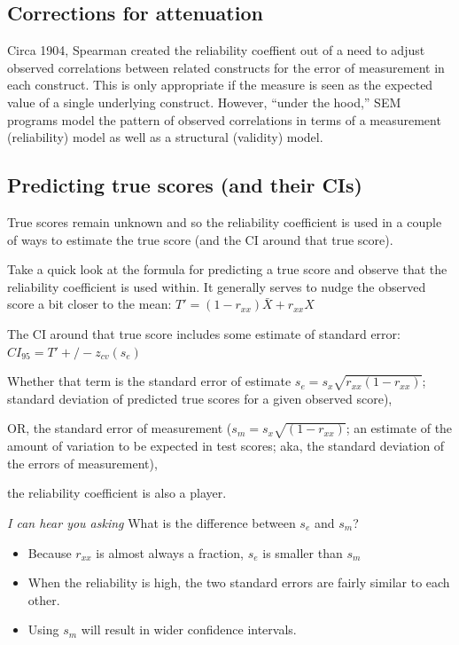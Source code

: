 \documentclass[
  english,
]{book}
\providecommand{\tightlist}{%
  \setlength{\itemsep}{0pt}\setlength{\parskip}{0pt}}
\begin{document}
\hypertarget{corrections-for-attenuation}{%
\subsection{Corrections for attenuation}\label{corrections-for-attenuation}}

Circa 1904, Spearman created the reliability coeffient out of a need to adjust observed correlations between related constructs for the error of measurement in each construct. This is only appropriate if the measure is seen as the expected value of a single underlying construct. However, ``under the hood,'' SEM programs model the pattern of observed correlations in terms of a measurement (reliability) model as well as a structural (validity) model.

\hypertarget{predicting-true-scores-and-their-cis}{%
\subsection{Predicting true scores (and their CIs)}\label{predicting-true-scores-and-their-cis}}

True scores remain unknown and so the reliability coefficient is used in a couple of ways to estimate the true score (and the CI around that true score).

Take a quick look at the formula for predicting a true score and observe that the reliability coefficient is used within. It generally serves to nudge the observed score a bit closer to the mean: \(T'=(1-r_{xx})\bar{X}+r_{xx}X\)

The CI around that true score includes some estimate of standard error: \(CI_{95}=T'+/-z_{cv}(s_{e})\)

Whether that term is the standard error of estimate
\(s_{e}=s_{x}\sqrt{r_{xx}(1-r_{xx})}\); standard deviation of predicted true scores for a given observed score),

OR, the standard error of measurement (\(s_{m}=s_{x}\sqrt{(1-r_{xx})}\); an estimate of the amount of variation to be expected in test scores; aka, the standard deviation of the errors of measurement),

the reliability coefficient is also a player.

\emph{I can hear you asking} What is the difference between \(s_{e}\) and \(s_{m}\)?

\begin{itemize}
\tightlist
\item
  Because \(r_{xx}\) is almost always a fraction, \(s_{e}\) is smaller than \(s_{m}\)
\item
  When the reliability is high, the two standard errors are fairly similar to each other.
\item
  Using \(s_{m}\) will result in wider confidence intervals.
\end{itemize}
\end{document}
